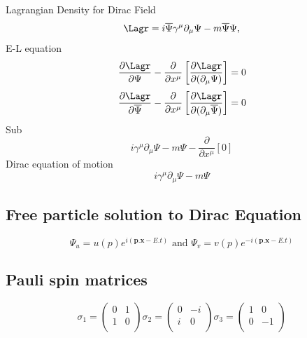 Lagrangian Density for Dirac Field
\begin{equation*}
\Lagr = i\overline{\Psi}\gamma^{\mu}\partial_{\mu}\Psi-m\overline{\Psi}\Psi,
\end{equation*}
E-L equation
\begin{equation*}
\frac{\partial \Lagr}{\partial \Psi} - \frac{\partial}{\partial x^{\mu}} \left[\frac{\partial \Lagr}{\partial(\partial_{\mu}\Psi)}\right] = 0 
\end{equation*}
\begin{equation*}
\frac{\partial \Lagr}{\partial \overline{\Psi}} - \frac{\partial}{\partial x^{\mu}} \left[\frac{\partial \Lagr}{\partial(\partial_{\mu}\overline{\Psi})}\right] = 0
\end{equation*}
Sub
\begin{equation*}
i\gamma^{\mu}\partial_{\mu}\Psi-m\Psi-\frac{\partial}{\partial x^{\mu}}[0]
\end{equation*}
Dirac equation of motion
\begin{equation*}
i\gamma^{\mu}\partial_{\mu}\Psi-m\Psi
\end{equation*}


\subsection{Free particle solution to Dirac Equation} %
\label{sub:free_particle_solution_to_dirac_equation*}
\begin{equation*}
	\Psi_{u} = u(p)e^{i(\mathbf{p.x}-E.t)}\,\,\text{and}\,\,\Psi_{v} = v(p)e^{-i(\mathbf{p.x}-E.t)}
\end{equation*}



\subsection{Pauli spin matrices} %
\label{sub:pauli_spin_matrices}
\begin{equation*}
\sigma_{1} = 
\begin{pmatrix} 
	0 	& 	1 \\
	1 	& 	0 \\
\end{pmatrix}
\sigma_{2} = 
\begin{pmatrix} 
	0 	& 	-i \\
	i 	& 	0 \\
\end{pmatrix}
\sigma_{3} = 
\begin{pmatrix} 
	1 	& 	0 \\
	0 	& 	-1 \\
\end{pmatrix}
\end{equation*}


